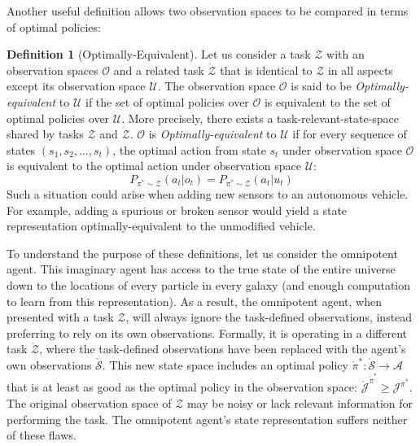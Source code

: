 \documentclass{article} %
\theoremstyle{definition}
\newtheorem{definition}{Definition}[section]
\begin{document}
Another useful definition allows two observation spaces to be compared
in terms of optimal policies:

\begin{definition}[Optimally-Equivalent]
\label{def:opt-equiv}
Let us consider a task $\mathcal{Z}$ with an observation spaces
$\mathcal{O}$ and a related task $\mathring{\mathcal{Z}}$ that is
identical to $\mathcal{Z}$ in all aspects except its observation space
$\mathcal{U}$. The observation space $\mathcal{O}$ is said to be
\textit{Optimally-equivalent} to $\mathcal{U}$ if the set of optimal
policies over $\mathcal{O}$ is equivalent to the set of optimal
policies over $\mathcal{U}$. More precisely, there exists a
task-relevant-state-space shared by tasks $\mathcal{Z}$ and
$\mathring{\mathcal{Z}}$. $\mathcal{O}$ is
\textit{Optimally-equivalent} to $\mathcal{U}$ if for every sequence
of states $(s_1, s_2, \dots, s_t)$, the optimal action from state
$s_t$ under observation space $\mathcal{O}$ is equivalent to the
optimal action under observation space $\mathcal{U}$:
\[
P_{\pi^* \sim \mathcal{Z}}(a_t | o_{t}) = P_{\pi^* \sim {\mathcal{Z}}}(a_t | u_{t})
\]
Such a situation could arise when adding new sensors to an autonomous
vehicle. For example, adding a spurious or broken sensor would yield a
state representation optimally-equivalent to the unmodified vehicle.
\end{definition}

To understand the purpose of these definitions, let us consider the
omnipotent agent. This imaginary agent has access to the true state of
the entire universe down to the locations of every particle in every
galaxy (and enough computation to learn from this representation). As
a result, the omnipotent agent, when presented with a task
$\mathcal{Z}$, will always ignore the task-defined observations,
instead preferring to rely on its own observations. Formally, it is
operating in a different task $\mathring{\mathcal{Z}}$, where the
task-defined observations have been replaced with the agent's own
observations $\mathring{\mathcal{S}}$. This new state space includes
an optimal policy $\mathring{\pi}^*: \mathring{\mathcal{S}}
\rightarrow \mathcal{A}$ that is at least as good as the optimal
policy in the observation space:
$\mathring{\mathcal{J}}^{\mathring{\pi}^*} \ge
\mathcal{J}^{\pi^*}$. The original observation space of $\mathcal{Z}$
may be noisy or lack relevant information for performing the task. The
omnipotent agent's state representation suffers neither of these
flaws.
\end{document}
